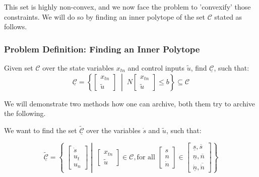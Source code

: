 This set is highly non-convex, and we now face the problem to 'convexify' those constraints.
We will do so by finding an inner polytope of the set $\mathcal{C}$ stated as follows.

\subsubsection{Problem Definition: Finding an Inner Polytope}
\label{problem:inner_polytope}
Given set $\mathcal{C}$ over the state variables $x_{tn}$ and control inputs $\tilde{u}$, find $\underline{\mathcal{C}}$, such that:
\begin{equation}
	\underline{\mathcal{C}} = \left\{ \begin{bmatrix}
		x_{tn} \\ \tilde{u} \end{bmatrix} \; \middle|\;
	N \begin{bmatrix}
		x_{tn} \\ \tilde{u} \end{bmatrix} \leq b
	\right\} \subseteq \mathcal{C}
\end{equation}

We will demonstrate two methods how one can archive, both them try to archive the following.

We want to find the set $\tilde{\underline{\mathcal{C}}}$ over the variables $\dot{s}$ and $\tilde{u}$, such that:

\begin{equation}
	\tilde{\underline{\mathcal{C}}} =
	\left\{ \;
	\begin{bmatrix}
		\dot{s} \\
		u_t     \\
		u_n
	\end{bmatrix}
	\middle|\;
	\begin{bmatrix}
		x_{tn} \\ \tilde{u}
	\end{bmatrix} \in \mathcal{C}, \text{for all } \begin{bmatrix}
		s \\
		n \\
		\dot{n}
	\end{bmatrix} \in \begin{bmatrix}
		\underline{s}, \overline{s} \\
		\underline{n}, \overline{n} \\
		\underline{\dot{n}},  \overline{\dot{n}}
	\end{bmatrix}
	\right\}
\end{equation}

